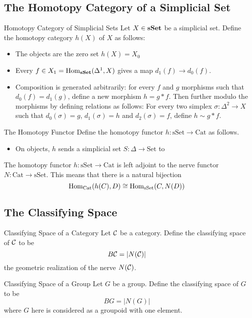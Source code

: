 \documentclass[a4paper]{article}
\begin{document}
\subsection{The Homotopy Category of a Simplicial Set}
\begin{defn}{Homotopy Category of Simplicial Sets}{} Let $X\in\bold{sSet}$ be a simplicial set. Define the homotopy category $h(X)$ of $X$ as follows: 
\begin{itemize}
\item The objects are the zero set $h(X)=X_0$
\item Every $f\in X_1=\operatorname{Hom}_\bold{sSet}(\Delta^1,X)$ gives a map $d_1(f)\to d_0(f)$.
\item Composition is generated arbitrarily: for every $f$ and $g$ morphisms such that $d_0(f)=d_1(g)$, define a new morphism $h=g\ast f$. Then further modulo the morphisms by defining relations as follows: For every two simplex $\sigma:\Delta^2\to X$ such that $d_0(\sigma)=g$, $d_1(\sigma)=h$ and $d_2(\sigma)=f$, define $h\sim g\ast f$. 
\end{itemize}
\end{defn}

\begin{defn}{The Homotopy Functor}{} Define the homotopy functor $h:\text{sSet}\to\text{Cat}$ as follows. 
\begin{itemize}
\item On objects, $h$ sends a simplicial set $S:\Delta\to\text{Set}$ to 
\end{itemize}
\end{defn}

\begin{thm}{}{} The homotopy functor $h:\text{sSet}\to\text{Cat}$ is left adjoint to the nerve functor $N:\text{Cat}\to\text{sSet}$. This means that there is a natural bijection $$\operatorname{Hom}_\text{Cat}(h(C),D)\cong\operatorname{Hom}_\text{sSet}(C,N(D))$$
\end{thm}

\subsection{The Classifying Space}
\begin{defn}{Classifying Space of a Category}{} Let $\mathcal{C}$ be a category. Define the classifying space of $\mathcal{C}$ to be $$B\mathcal{C}=|N(\mathcal{C})|$$ the geometric realization of the nerve $N(\mathcal{C})$. 
\end{defn}

\begin{defn}{Classifying Space of a Group}{} Let $G$ be a group. Define the classifying space of $G$ to be $$BG=|N(G)|$$ where $G$ here is considered as a groupoid with one element. 
\end{defn}
\end{document}
